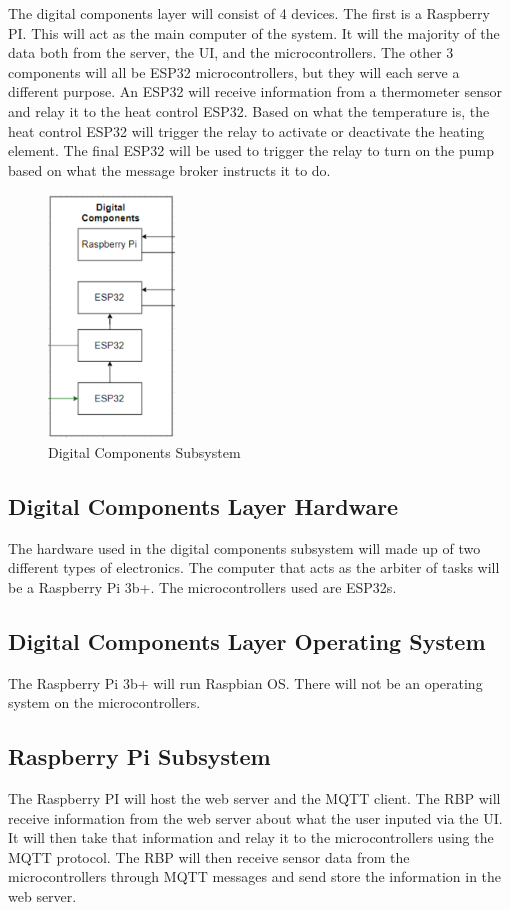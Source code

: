 The digital components layer will consist of 4 devices. The first is a Raspberry
PI. This will act as the main computer of the system. It will the majority of
the data both from the server, the UI, and the microcontrollers. The other 3
components will all be ESP32 microcontrollers, but they will each serve a
different purpose. An ESP32 will receive information from a thermometer sensor
and relay it to the heat control ESP32. Based on what the temperature is, the
heat control ESP32 will trigger the relay to activate or deactivate the heating
element. The final ESP32 will be used to trigger the relay to turn on the pump
based on what the message broker instructs it to do.   

\begin{figure}[h!]
	\centering
 	\includegraphics[width=0.30\textwidth]{images/digital_components.png}
  \caption{Digital Components Subsystem}
\end{figure}

\subsection{Digital Components Layer Hardware}
The hardware used in the digital components subsystem will made up of two
different types of electronics. The computer that acts as the arbiter of tasks
will be a Raspberry Pi 3b+. The microcontrollers used are ESP32s. 

\subsection{Digital Components Layer Operating System}
The Raspberry Pi 3b+ will run Raspbian OS. There will not be an operating system
on the microcontrollers. 

\subsection{Raspberry Pi Subsystem}
The Raspberry PI will host the web server and the MQTT client. The RBP will
receive information from the web server about what the user inputed via the UI.
It will then take that information and relay it to the microcontrollers using
the MQTT protocol. The RBP will then receive sensor data from the
microcontrollers through MQTT messages and send store the information in the web
server. 

